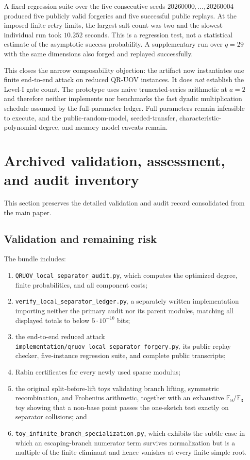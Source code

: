 \documentclass[11pt,a4paper]{article}
\theoremstyle{definition}
\theoremstyle{remark}
\newcommand{\F}{\mathbb F}
\begin{document}
A fixed regression suite over the five consecutive seeds $20260000,\ldots,20260004$ produced five publicly valid forgeries and five successful public replays.  At the imposed finite retry limits, the largest salt count was two and the slowest individual run took $10.252$ seconds.  This is a regression test, not a statistical estimate of the asymptotic success probability.  A supplementary run over $q=29$ with the same dimensions also forged and replayed successfully.

This closes the narrow composability objection: the artifact now instantiates one finite end-to-end attack on reduced QR-UOV instances.  It does \emph{not} establish the Level-I gate count.  The prototype uses naive truncated-series arithmetic at $a=2$ and therefore neither implements nor benchmarks the fast dyadic multiplication schedule assumed by the full-parameter ledger.  Full parameters remain infeasible to execute, and the public-random-model, seeded-transfer, characteristic-polynomial degree, and memory-model caveats remain.

\section{Archived validation, assessment, and audit inventory}\label{app:validation-audits}

This section preserves the detailed validation and audit record consolidated from the main paper.

\subsection{Validation and remaining risk}

The bundle includes:
\begin{enumerate}
\item \texttt{QRUOV\_local\_separator\_audit.py}, which computes the optimized degree, finite probabilities, and all component costs;
\item \texttt{verify\_local\_separator\_ledger.py}, a separately written implementation importing neither the primary audit nor its parent modules, matching all displayed totals to below $5\cdot10^{-10}$ bits;
\item the end-to-end reduced attack \texttt{implementation/qruov\_local\_separator\_forgery.py}, its public replay checker, five-instance regression suite, and complete public transcripts;
\item Rabin certificates for every newly used sparse modulus;
\item the original split-before-lift toys validating branch lifting, symmetric recombination, and Frobenius arithmetic, together with an exhaustive $\F_9/\F_3$ toy showing that a non-base point passes the one-sketch test exactly on separator collisions; and
\item \texttt{toy\_infinite\_branch\_specialization.py}, which exhibits the subtle case in which an escaping-branch numerator term survives normalization but is a multiple of the finite eliminant and hence vanishes at every finite simple root.
\end{enumerate}
\end{document}

